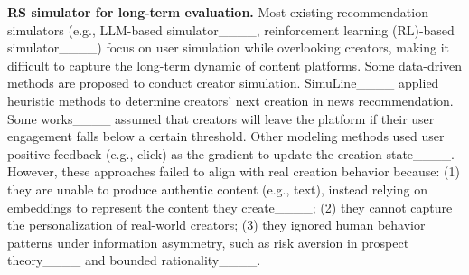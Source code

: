 \textbf{RS simulator for long-term evaluation.} 
Most existing recommendation simulators (e.g., LLM-based simulator____, reinforcement learning (RL)-based simulator____) focus on user simulation while overlooking creators, making it difficult to capture the long-term dynamic of content platforms.
Some data-driven methods are proposed to conduct creator simulation.  SimuLine____ applied heuristic methods to determine creators' next creation in news recommendation. 
Some works____ assumed that creators will leave the platform if their user engagement falls below a certain threshold.
Other modeling methods used user positive feedback (e.g., click) as the gradient to update the creation state____.
However, these approaches failed to align with real creation behavior because: (1) they are unable to produce authentic content (e.g., text), instead relying on embeddings to represent the content they create____; (2) they cannot capture the personalization of real-world creators; (3) they ignored human behavior patterns under information asymmetry, such as risk aversion in prospect theory____ and bounded rationality____.








